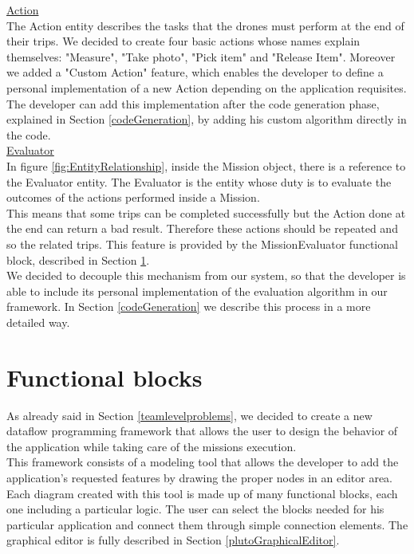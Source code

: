 \underline{Action}
\\

The Action entity describes the tasks that the drones must perform at the end of their trips.
We decided to create four basic actions whose names explain themselves: "Measure", "Take photo", "Pick item" and "Release Item". 
Moreover we added a "Custom Action" feature, which enables the developer to define a personal implementation of a new Action depending on the application requisites.
The developer can add this implementation after the code generation phase, explained in Section \ref{codeGeneration}, by adding his custom algorithm directly in the code.
\\

\underline{Evaluator}
\\

In figure \ref{fig:EntityRelationship}, inside the Mission object, there is a reference to the Evaluator entity. 
The Evaluator is the entity whose duty is to evaluate the outcomes of the actions performed inside a Mission.
\\
This means that some trips can be completed successfully but the Action done at the end can return a bad result. Therefore these actions should be repeated and so the related trips. 
This feature is provided by the MissionEvaluator functional block, described in Section \ref{functionalBlocks}.
\\
We decided to decouple this mechanism from our system, so that the developer is able to include its personal implementation of the evaluation algorithm in our framework. 
In Section \ref{codeGeneration} we describe this process in a more detailed way.
\\

\section{Functional blocks}
\label{functionalBlocks}

As already said in Section \ref{teamlevelproblems}, we decided to create a new dataflow programming framework that allows the user to design the behavior of the application while taking care of the missions execution.
\\

This framework consists of a modeling tool that allows the developer to add the application's requested features by drawing the proper nodes in an editor area.
\\
Each diagram created with this tool is made up of many functional blocks, each one including a particular logic.
The user can select the blocks needed for his particular application and connect them through simple connection elements.
The graphical editor is fully described in Section \ref{plutoGraphicalEditor}.
\\

